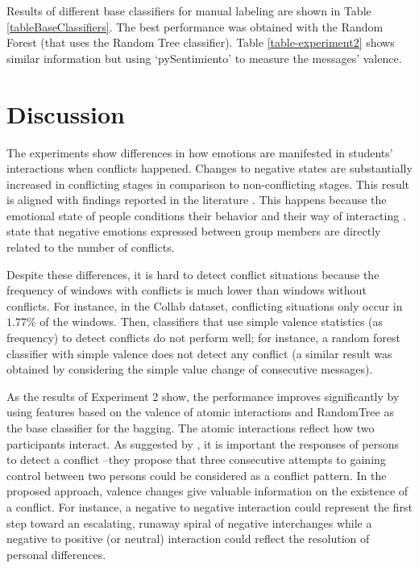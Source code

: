 \documentclass[3p,times,preprint]{elsarticle}
\begin{document}
Results of different base classifiers for manual labeling are shown in Table \ref{tableBaseClassifiers}. The best performance was obtained with the Random Forest (that uses the Random Tree classifier). Table \ref{table-experiment2} shows similar information but using `pySentimiento' to measure the messages' valence.

\section{Discussion}\label{disussion}
The experiments show differences in how emotions are manifested in students' interactions when conflicts happened. Changes to negative states are substantially increased in conflicting stages in comparison to non-conflicting stages. This result is aligned with findings reported in the literature \citep{Jiang2013,Lee2015,Zakaria2009,Lescano2020}. This happens because the emotional state of people conditions their behavior and their way of interacting \citep{Heerdink2013,Garcia-prieto2003}.  \cite{Wall1986} state that negative emotions expressed between group members are directly related to the number of conflicts. 

Despite these differences, it is hard to detect conflict situations because the frequency of windows with conflicts is much lower than windows without conflicts. For instance, in the Collab dataset, conflicting situations only occur in $1.77$\% of the windows. Then, classifiers that use simple valence statistics (as frequency) to detect conflicts do not perform well; for instance, a random forest classifier with simple valence does not detect any conflict  (a similar result was obtained by considering the simple value change of consecutive messages). 

As the results of Experiment 2 show, the performance improves significantly by using features based on the valence of atomic interactions and RandomTree as the base classifier for the bagging.  The atomic interactions reflect how two participants interact. As suggested by \cite{Millar1984}, it is important the responses of persons to detect a conflict --they propose that three consecutive attempts to gaining control between two persons could be considered as a conflict pattern. In the proposed approach, valence changes give valuable information on the existence of a conflict. For instance, a negative to negative interaction could represent the first step toward an escalating, runaway spiral of negative interchanges while a  negative to positive (or neutral) interaction could reflect the resolution of personal differences.
\end{document}
